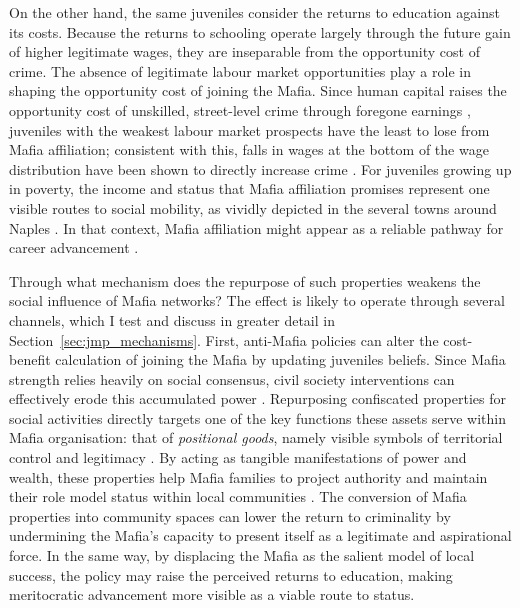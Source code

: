 \documentclass[12pt]{article}
\theoremstyle{plain}
\theoremstyle{plain}
\theoremstyle{plain}
\theoremstyle{definition}
\theoremstyle{plain}
\theoremstyle{definition}
\theoremstyle{plain}
\theoremstyle{remark}
\theoremstyle{definition}
\theoremstyle{definition}
\theoremstyle{plain}
\begin{document}
On the other hand, the same juveniles consider the returns to education against its costs. Because the returns to schooling operate largely through the future gain of higher legitimate wages, they are inseparable from the opportunity cost of crime. The absence of legitimate labour market opportunities play a role in shaping the opportunity cost of joining the Mafia. Since human capital raises the opportunity cost of unskilled, street-level crime through foregone earnings \citep{lochner_education_2004}, juveniles with the weakest labour market prospects have the least to lose from Mafia affiliation; consistent with this, falls in wages at the bottom of the wage distribution have been shown to directly increase crime \citep{machin_crime_2004}. For juveniles growing up in poverty, the income and status that Mafia affiliation promises represent one visible routes to social mobility, as vividly depicted in the several towns around Naples \citet{balestrini_sandokan_2004}. In that context, Mafia affiliation might appear as a reliable pathway for career advancement \citep{catozzella_alveare_2011}.  \par
\medskip
 Through what mechanism does the repurpose of such properties weakens the social influence of Mafia networks? The effect is likely to operate through several channels, which I test and discuss in greater detail in Section~\ref{sec:jmp_mechanisms}.
First, anti-Mafia policies can alter the cost-benefit calculation of joining the Mafia by updating juveniles beliefs. Since Mafia strength relies heavily on social consensus, civil society interventions can effectively erode this accumulated power \citep{arlacchi_palude_1987}. Repurposing confiscated properties for social activities directly targets one of the key functions these assets serve within Mafia organisation: that of \emph{positional goods}, namely visible symbols of territorial control and legitimacy \citep{hirsch_social_1976, baldascino_gestione_2012}. By acting as tangible manifestations of power and wealth, these properties help Mafia families to project authority and maintain their role model status within local communities \citep{mosca_social_2017}. The conversion of Mafia properties into community spaces can lower the return to criminality by undermining the Mafia's capacity to present itself as a legitimate and aspirational force. In the same way, by displacing the Mafia as the salient model of local success, the policy may raise the perceived returns to education, making meritocratic advancement more visible as a viable route to status. \\
\end{document}
